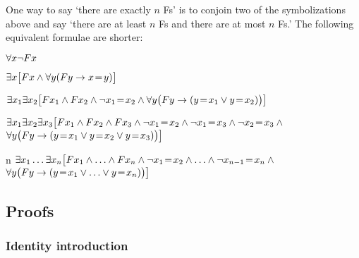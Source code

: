 One way to say `there are exactly $n$ Fs' is to conjoin two of the symbolizations above and say `there are at least $n$ Fs and there are at most $n$ Fs.' The following equivalent formulae are shorter:
\begin{ekey}
	\item[\text{zero}] $\forall x\neg Fx$
	\item[\text{one}] $\exists x\bigl[Fx \mathbin{\wedge} \forall y(Fy \rightarrow x\!=\!  y)\bigr]$
	\item[\text{two}] $\exists x_1\exists x_2\bigl[Fx_1 \mathbin{\wedge} Fx_2 \mathbin{\wedge} \neg x_1 \!=\!  x_2 \mathbin{\wedge} \forall y\bigl(Fy \rightarrow (y\!=\!  x_1 \vee y \!=\!  x_2)\bigr) \bigr]$
	\item[\text{three}] $\exists x_1\exists x_2\exists x_3\bigl[Fx_1 \mathbin{\wedge} Fx_2 \mathbin{\wedge} Fx_3 \mathbin{\wedge} \neg x_1 \!=\!   x_2 \mathbin{\wedge} \neg  x_1 \!=\!  x_3 \mathbin{\wedge} \neg x_2 \!=\!  x_3 \mathbin{\wedge} \phantom{.}$\\
	\phantom{$\exists x_1 \exists x_2$}$\forall y\bigl(Fy \rightarrow (y \!=\!  x_1 \vee y \!=\!  x_2 \vee y \!=\!   x_3)\bigr) \bigr]$
	\item[n] $\exists x_1\ldots\exists x_n\bigl[Fx_1 \mathbin{\wedge}\ldots\mathbin{\wedge} Fx_n  \mathbin{\wedge} \neg x_1 \!=\!  x_2 \mathbin{\wedge}\ldots\mathbin{\wedge} \neg x_{n-1}\!=\!  x_n \mathbin{\wedge} \phantom{.}$\\
	\phantom{$\exists x_1\exists x_2$}$\forall y\bigl(Fy \rightarrow (y\!=\!  x_1 \vee \ldots \vee y\!=\!  x_n)\bigr)\bigr]$ 
\end{ekey}



\subsection{Proofs} 


\subsubsection*{Identity introduction}

